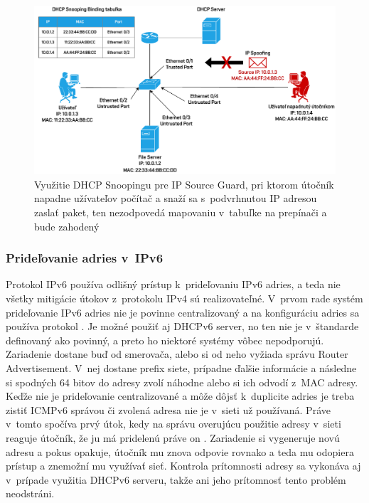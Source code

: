 \begin{figure}[H]
	\begin{center}
		\includegraphics[scale=0.75]{obrazky/dhcp-snoop.pdf}
	\end{center}
	\caption[DHCP Snooping a IP Source Guard]{Využitie DHCP Snoopingu pre IP Source Guard, pri ktorom útočník napadne užívateľov počítač a snaží sa s~podvrhnutou IP adresou zaslať paket, ten nezodpovedá mapovaniu v~tabuľke na prepínači a bude zahodený}
	\label{fig:dhcpsnoop}
\end{figure}    

\subsubsection{Prideľovanie adries v~IPv6}
Protokol IPv6 používa odlišný prístup k~prideľovaniu IPv6 adries, a teda nie všetky mitigácie útokov z~protokolu IPv4 sú realizovateľné. V~prvom rade systém prideľovanie IPv6 adries nie je povinne centralizovaný a na konfiguráciu adries sa používa protokol . Je možné použiť aj DHCPv6 server, no ten nie je v~štandarde definovaný ako povinný, a preto ho niektoré systémy vôbec nepodporujú. Zariadenie dostane buď od smerovača, alebo si od neho  vyžiada správu Router Advertisement. V~nej dostane prefix siete, prípadne ďalšie informácie a následne si spodných 64 bitov do adresy zvolí náhodne alebo si ich odvodí z~MAC adresy. Keďže nie je prideľovanie centralizované a môže dôjsť k~duplicite adries je treba zistiť ICMPv6 správou či zvolená adresa nie je v~sieti už používaná. Práve v~tomto spočíva prvý útok, kedy na správu overujúcu použitie adresy v~sieti reaguje útočník, že ju má pridelenú práve on \cite{Hg83oflOfHBGeWfs}. Zariadenie si vygeneruje novú adresu a pokus opakuje, útočník mu znova odpovie rovnako a teda mu odopiera prístup a znemožní mu využívať sieť. Kontrola prítomnosti adresy sa vykonáva aj v~prípade využitia DHCPv6 serveru, takže ani jeho prítomnosť tento problém neodstráni. 

